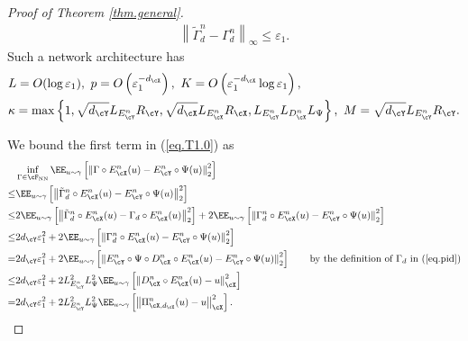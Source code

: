 \documentclass[11pt]{article} %
\begin{document}
\begin{proof}[Proof of Theorem \ref{thm.general}]
 \begin{align}
 	\left\|\widetilde{\Gamma}_d^n-\Gamma_d^n\right\|_{\infty}\leq \varepsilon_1.
 \end{align}
 Such a network architecture has
 \begin{equation}
 	\begin{aligned}
 		&L=O(\log \varepsilon_1), \ p=O\left(\varepsilon_1^{-d_{\cX}}\right),\ K=O\left(\varepsilon_1^{-d_{\cX}}\log \varepsilon_1\right), \\
 		& \kappa=\max\left\{1,\sqrt{d_{\cY}}L_{E^n_{\cY}}R_{\cY}, \sqrt{d_{\cX}}L_{E^n_{\cX}}R_{\cX},L_{E^n_{\cY}}L_{D^n_{\cX}}L_{\Psi} \right\},\ M=\sqrt{d_{\cY}}L_{E^n_{\cY}}R_{\cY}.
 	\end{aligned}
 \label{eq.T1.archi}
 \end{equation}

 
 We bound the first term in (\ref{eq.T1.0}) as
 \begin{align}
 	& \inf_{\Gamma\in \cF_{\rm NN}}\EE_{u\sim \gamma}\left[ \left\| \Gamma \circ E_{\cX}^n(u)- E_{\cY}^n\circ
 	\Psi(u)\right\|_{2}^2 \right]\nonumber\\
 	\leq &\EE_{u\sim \gamma}\left[ \left\| \tilde{\Gamma}_d^n \circ E_{\cX}^n(u)- E_{\cY}^n\circ \Psi(u)\right\|_{2}^2\right] \nonumber\\
 	\leq & 2\EE_{u\sim \gamma} \left[ \left\| \tilde{\Gamma}_d^n \circ E_{\cX}^n(u)-\Gamma_d \circ E_{\cX}^n(u)\right\|_2^2\right]+ 2\EE_{u\sim \gamma}\left[ \left\|\Gamma_d^n \circ E_{\cX}^n(u)- E_{\cY}^n\circ \Psi(u)\right\|_{2}^2\right] \nonumber\\
 	\leq& 2d_{\cY}\varepsilon_1^2+ 2\EE_{u\sim \gamma}\left[ \left\|\Gamma_d^n \circ E_{\cX}^n(u)- E_{\cY}^n\circ \Psi(u)\right\|_{2}^2\right] \nonumber\\
 	= &2d_{\cY}\varepsilon_1^2+ 2\EE_{u\sim \gamma}\left[ \left\|E_{\cY}^n\circ\Psi\circ D_{\cX}^n \circ E_{\cX}^n(u)- E_{\cY}^n\circ \Psi(u)\right\|_{2}^2\right] \tag*{by the definition of $\Gamma_d$ in (\ref{eq.pid})}\\
 	\leq &2d_{\cY}\varepsilon_1^2+ 2L_{E^n_{\cY}}^2L_{\Psi}^2\EE_{u\sim \gamma} \left[ \left\| D_{\cX}^n \circ E_{\cX}^n(u)- u\right\|_{\cX}^2\right] \nonumber\\
 	=& 2d_{\cY}\varepsilon_1^2+ 2L_{E^n_{\cY}}^2L_{\Psi}^2\EE_{u\sim \gamma} \left[ \left\| \Pi_{\cX,d_{\cX}}^n(u)- u\right\|_{\cX}^2\right].
 	\label{eq.T1.1}
 \end{align}
 

\end{proof}
\end{document}
